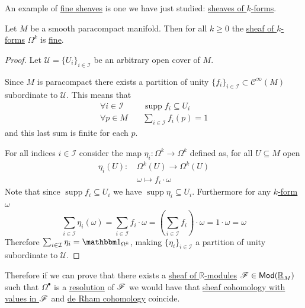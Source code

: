 \documentclass[../../main]{subfiles}
\begin{document}
An example of \hyperref[def:fine-sheaf]{fine sheaves} is one we have just studied: \hyperref[def:smooth-k-form]{sheaves of \(k\)-forms}.
\begin{lemma} \label{lemma:smooth-k-form-fine}
  Let \(M\) be a smooth paracompact manifold.
  Then for all \(k \geq 0\) the \hyperref[def:smooth-k-form]{sheaf of \(k\)-forms} \(\Omega^{k}\) is \hyperref[def:fine-sheaf]{fine}.
\end{lemma}
\begin{proof}
  Let \(\mathcal{U} = \{U_{i}\}_{i \in \mathcal{I}}\) be an arbitrary open cover of \(M\).

  Since \(M\) is paracompact there exists a partition of unity \(\{f_{i}\}_{i \in \mathcal{I}} \subset \mathcal{C}^{\infty}(M)\) subordinate to \(\mathcal{U}\).
  This means that
  \begin{align*}
    \forall i \in \mathcal{I} \quad& \operatorname{supp} f_{i} \subseteq U_{i} \\
    \forall p \in M \quad& \sum_{i \in \mathcal{I}} f_{i}(p) = 1
  \end{align*}
  and this last sum is finite for each \(p\).

  For all indices \(i \in \mathcal{I}\) consider the map \(\eta_{i}\colon \Omega^{k} \to \Omega^{k}\) defined as, for all \(U \subseteq M\) open
  \begin{align*}
    \eta_{i}(U):\,& \Omega^{k}(U) \to \Omega^{k}(U) \\
            & \omega \mapsto f_{i} \cdot \omega
  \end{align*}
  Note that since \(\operatorname{supp} f_{i} \subseteq U_{i}\) we have \(\operatorname{supp} \eta_{i} \subseteq U_{i}\).
  Furthermore for any \hyperref[def:smooth-k-form]{\(k\)-form} \(\omega\)
  \begin{equation*}
    \sum_{i \in \mathcal{I}} \eta_{i}(\omega) = \sum_{i \in \mathcal{I}} f_{i} \cdot \omega = \left( \sum_{i \in \mathcal{I}} f_{i} \right) \cdot \omega = 1 \cdot \omega = \omega
  \end{equation*}
  Therefore \(\sum_{i \in \mathcal{I}} \eta_{i} = \id_{\Omega^{k}}\), making \(\{\eta_{i}\}_{i \in \mathcal{I}}\) a partition of unity subordinate to \(\mathcal{U}\).
\end{proof}

Therefore if we can prove that there exists a \hyperref[def:sheaf]{sheaf of \(\mathbb{R}\)-modules} \(\mathscr{F} \in \mathsf{Mod}(\underline{\mathbb{R}}_{M})\) such that \(\Omega^{\bullet}\) is a \hyperref[def:resolution]{resolution} of \(\mathscr{F}\) we would have that \hyperref[def:sheaf-cohomology]{sheaf cohomology with values in \(\mathscr{F}\)} and \hyperref[def:de-rham-cohomology]{de Rham cohomology} coincide.
\end{document}
